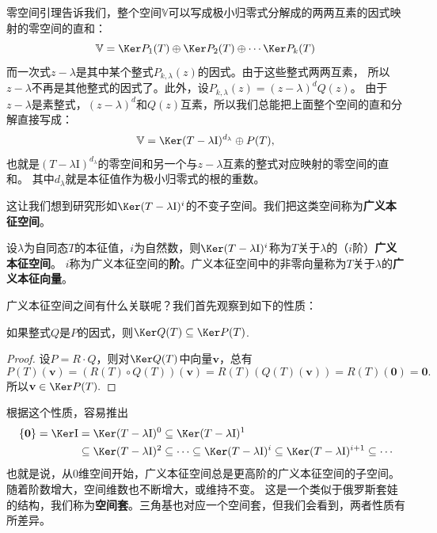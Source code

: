 \documentclass[12pt,UTF8]{ctexbook}
\begin{document}
零空间引理告诉我们，整个空间$\mathbb{V}$可以写成极小归零式分解成的两两互素的因式映射的零空间的直和：
$$ \mathbb{V} = \Ker P_1(T) \oplus \Ker P_2(T) \oplus \cdots \Ker P_k(T)$$
而一次式$z - \lambda$是其中某个整式$P_{k,\lambda}(z)$的因式。由于这些整式两两互素，
所以$z - \lambda$不再是其他整式的因式了。此外，设$P_{k,\lambda}(z) = (z - \lambda)^{d} Q(z)$。
由于$z - \lambda$是素整式，$(z - \lambda)^{d}$和$Q(z)$互素，所以我们总能把上面整个空间的直和分解直接写成：
$$ \mathbb{V} = \Ker (T - \lambda\mathrm{I})^{d_\lambda} \oplus P(T),$$
也就是$(T - \lambda\mathrm{I})^{d_\lambda}$的零空间和另一个与$z - \lambda$互素的整式对应映射的零空间的直和。
其中$d_\lambda$就是本征值作为极小归零式的根的重数。

这让我们想到研究形如$\Ker (T - \lambda\mathrm{I})^i$的不变子空间。我们把这类空间称为\textbf{广义本征空间}。

\begin{df}\label{df:6_4}
    设$\lambda$为自同态$T$的本征值，$i$为自然数，则$\Ker (T - \lambda\mathrm{I})^i$称为$T$关于$\lambda$的（$i$阶）\textbf{广义本征空间}。
    $i$称为广义本征空间的\textbf{阶}。广义本征空间中的非零向量称为$T$关于$\lambda$的\textbf{广义本征向量}。
\end{df}

广义本征空间之间有什么关联呢？我们首先观察到如下的性质：
\begin{pp}\label{pp:6_12_1}
    如果整式$Q$是$P$的因式，则$\Ker Q(T) \subseteq \Ker P(T)$.
\end{pp}
\begin{proof} %
    设$P = R \cdot Q$，则对$\Ker Q(T)$中向量$\mathbf{v}$，总有
    $$P(T)(\mathbf{v}) = (R(T)\circ Q(T))(\mathbf{v}) = R(T)(Q(T)(\mathbf{v})) = R(T)(\mathbf{0}) = \mathbf{0}. $$
    所以$\mathbf{v} \in \Ker P(T).$

\end{proof}

根据这个性质，容易推出
\begin{align*}
    \{\mathbf{0}\} = \Ker \mathrm{I} &= \Ker (T - \lambda\mathrm{I})^0 \subseteq \Ker (T - \lambda\mathrm{I})^1  \\
    &\subseteq \Ker (T - \lambda\mathrm{I})^2 \subseteq \cdots \subseteq \Ker (T - \lambda\mathrm{I})^i \subseteq \Ker (T - \lambda\mathrm{I})^{i+1} \subseteq \cdots 
\end{align*}
也就是说，从0维空间开始，广义本征空间总是更高阶的广义本征空间的子空间。随着阶数增大，空间维数也不断增大，或维持不变。
这是一个类似于俄罗斯套娃的结构，我们称为\textbf{空间套}。三角基也对应一个空间套，但我们会看到，两者性质有所差异。
\end{document}
